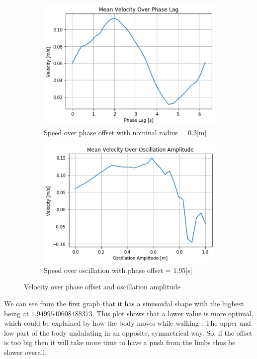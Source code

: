 \documentclass{cmc}
\begin{document}
\begin{figure}[H] 
  \begin{subfigure}[b]{0.5\linewidth}
    \centering
    \includegraphics[width=0.9\linewidth]{figures/8f1_velocity_over_phase.png} 
    \caption{Speed over phase offset with nominal radius = 0.3[m]} 
    \label{fig:exercise8f1_results:a} 
  \end{subfigure}%
  \begin{subfigure}[b]{0.5\linewidth}
    \centering
    \includegraphics[width=0.9\linewidth]{figures/8f2_velocity_over_oscillation.png} 
    \caption{Speed over oscillation with phase offset = 1.95[s]} 
    \label{fig:exercise8f2_results:b} 
  \end{subfigure}
  \caption{Velocity over phase offset and oscillation amplitude}
  \label{fig:exercise8f_results} 
\end{figure}

We can see from the first graph that it has a sinusoidal shape with the highest being at $1.9499540608488373$. This plot shows that a lower value is more optimal, which could be explained by how the body moves while walking : The upper and low part of the body undulating in an opposite, symmetrical way. So, if the offset is too big then it will take more time to have a push from the limbs thus be slower overall.
\end{document}
